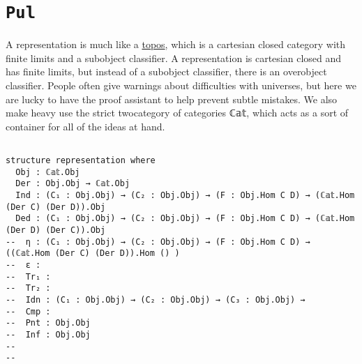 \section{\texttt{Pul}}

A representation is much like a \href{https://ncatlab.org/nlab/show/topos}{topos}, which is a cartesian closed category with finite limits and a subobject classifier. A representation is cartesian closed and has finite limits, but instead of a subobject classifier, there is an overobject classifier. People often give warnings about difficulties with universes, but here we are lucky to have the proof assistant to help prevent subtle mistakes. We also make heavy use the strict twocategory of categories ℂ𝕒𝕥, which acts as a sort of container for all of the ideas at hand.

\begin{center}
\begin{tcolorbox}[width=5in,colback={white},title={\begin{center}\texttt{Lean \thelcounter} \addtocounter{lcounter}{1}  \end{center}},colbacktitle=Blue,coltitle=black]
\begin{verbatim}

structure representation where
  Obj : ℂ𝕒𝕥.Obj
  Der : Obj.Obj → ℂ𝕒𝕥.Obj
  Ind : (C₁ : Obj.Obj) → (C₂ : Obj.Obj) → (F : Obj.Hom C D) → (ℂ𝕒𝕥.Hom (Der C) (Der D)).Obj
  Ded : (C₁ : Obj.Obj) → (C₂ : Obj.Obj) → (F : Obj.Hom C D) → (ℂ𝕒𝕥.Hom (Der D) (Der C)).Obj
--  η : (C₁ : Obj.Obj) → (C₂ : Obj.Obj) → (F : Obj.Hom C D) → ((ℂ𝕒𝕥.Hom (Der C) (Der D)).Hom () )
--  ε :
--  Tr₁ :
--  Tr₂ :
--  Idn : (C₁ : Obj.Obj) → (C₂ : Obj.Obj) → (C₃ : Obj.Obj) → 
--  Cmp :
--  Pnt : Obj.Obj
--  Inf : Obj.Obj
--  
--  

\end{verbatim}
\end{tcolorbox}
\end{center}


\begin{center}
\begin{tcolorbox}[width=5in,colback={white},title={\begin{center}\texttt{Lean \thelcounter} \addtocounter{lcounter}{1}  \end{center}},colbacktitle=Blue,coltitle=black]
\begin{verbatim}

\end{verbatim}
\end{tcolorbox}
\end{center}


